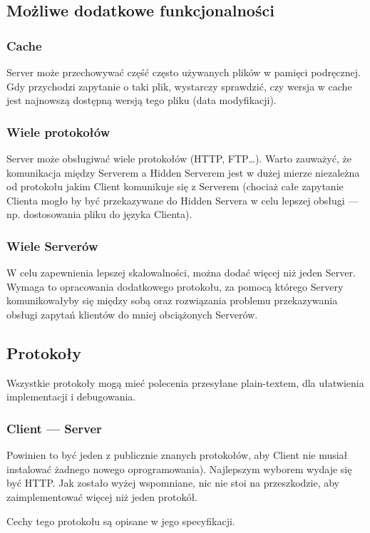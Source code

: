 \documentclass[a4paper,notitlepage]{article}
\begin{document}
\subsection{Możliwe dodatkowe funkcjonalności}
\subsubsection{Cache}
Server może przechowywać część często używanych plików w pamięci podręcznej. Gdy przychodzi
zapytanie o taki plik, wystarczy sprawdzić, czy wersja w cache jest najnowszą dostępną
wersją tego pliku (data modyfikacji).
\subsubsection{Wiele protokołów}
Server może obsługiwać wiele protokołów (HTTP, FTP\ldots). Warto zauważyć, że komunikacja 
między Serverem a Hidden Serverem jest w dużej mierze niezależna od protokołu jakim 
Client komunikuje się z Serverem (chociaż całe zapytanie Clienta mogło by być przekazywane 
do Hidden Servera w celu lepszej obsługi --- np. dostosowania pliku do języka Clienta).
\subsubsection{Wiele Serverów}
W celu zapewnienia lepszej skalowalności, można dodać więcej niż jeden Server. Wymaga
to opracowania dodatkowego protokołu, za pomocą którego Servery komunikowałyby się 
między sobą oraz rozwiązania problemu przekazywania obsługi zapytań klientów do mniej 
obciążonych Serverów.
\subsection{Protokoły}
Wszystkie protokoły mogą mieć polecenia przesyłane plain-textem, dla ułatwienia
implementacji i debugowania.
\subsubsection{Client --- Server}
Powinien to być jeden z publicznie znanych protokołów, aby Client nie musiał instalować
żadnego nowego oprogramowania). Najlepszym wyborem wydaje się być HTTP. 
Jak zostało wyżej wspomniane, nic nie stoi na przeszkodzie,
aby zaimplementować więcej niż jeden protokół.

\noindent Cechy tego protokołu są opisane w jego specyfikacji.
\end{document}
